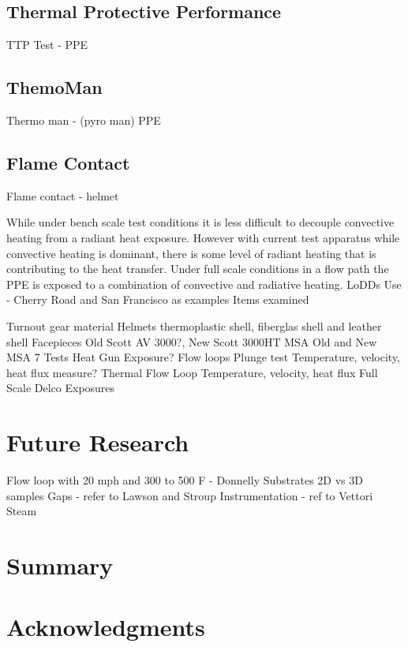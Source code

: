 \documentclass[12pt,oneside]{book}
\begin{document}
\section{Thermal Protective Performance}
TTP Test - PPE

\section{ThemoMan}
Thermo man - (pyro man) PPE

\section{Flame Contact}
Flame contact - helmet

While under bench scale test conditions it is less difficult to decouple convective heating from a radiant heat exposure.  However with current test apparatus while convective heating is dominant, there is some level of radiant heating that is contributing to the heat transfer.
Under full scale conditions in a flow path the PPE is exposed to a combination of convective and radiative heating.
LoDDs
Use - Cherry Road and San Francisco as examples
Items examined

Turnout gear material
Helmets    thermoplastic shell, fiberglas shell and leather shell
Facepieces
Old Scott AV 3000?,  New Scott 3000HT
MSA Old  and New MSA 7
Tests
Heat Gun Exposure?
Flow loops
	Plunge test
		Temperature, velocity, heat flux measure?
	Thermal Flow Loop
		Temperature, velocity, heat flux
Full Scale
	Delco Exposures


\chapter{Future Research}
Flow loop  with 20 mph and 300 to 500 F - Donnelly
Substrates
2D vs 3D samples
Gaps - refer to Lawson and Stroup
Instrumentation - ref to Vettori
Steam

\chapter{Summary}

\chapter{Acknowledgments}



\appendix
\end{document}
